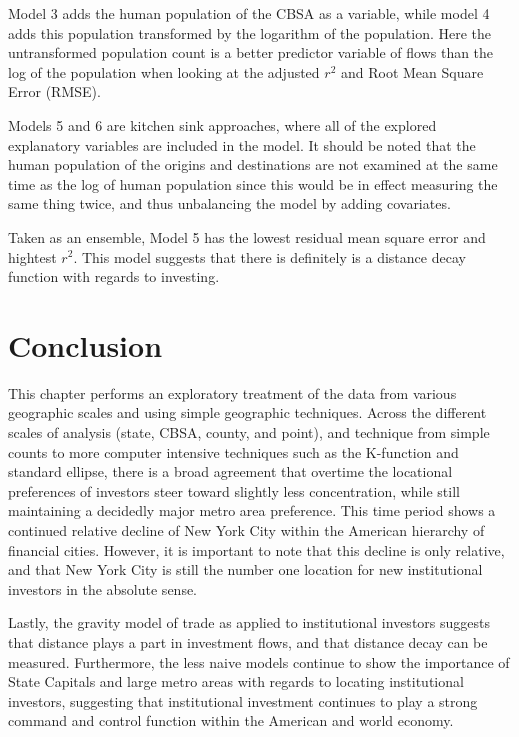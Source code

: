 Model 3 adds the human population of the CBSA as a variable, while model 4 adds this population transformed by the logarithm of the population.  Here the untransformed population count is a better predictor variable of flows than the log of the population when looking at the adjusted $r^{2}$ and Root Mean Square Error (RMSE).  

Models 5 and 6 are kitchen sink approaches, where all of the explored explanatory variables are included in the model.  It should be noted that the human population of the origins and destinations are not examined at the same time as the log of human population since this would be in effect measuring the same thing twice, and thus unbalancing the model by adding covariates.  

Taken as an ensemble, Model 5 has the lowest residual mean square error and hightest $r^{2}$.  This model suggests that there is definitely is a distance decay function with regards to investing.   

\section{Conclusion}

This chapter performs an exploratory treatment of the data from various geographic scales and using simple geographic techniques.  Across the different scales of analysis (state, CBSA, county, and point), and technique from simple counts to more computer intensive techniques such as the K-function and standard ellipse, there is a broad agreement that overtime the locational preferences of investors steer toward slightly less concentration, while still maintaining a decidedly major metro area preference.  This time period shows a continued relative decline of New York City within the American hierarchy of financial cities.  However, it is important to note that this decline is only relative, and that New York City is still the number one location for new institutional investors in the absolute sense.  

Lastly, the gravity model of trade as applied to institutional investors suggests that distance plays a part in investment flows, and that distance decay can be measured.  Furthermore, the less naive models continue to show the importance of State Capitals and large metro areas with regards to locating institutional investors, suggesting that institutional investment continues to play a strong command and control function within the American and world economy. 